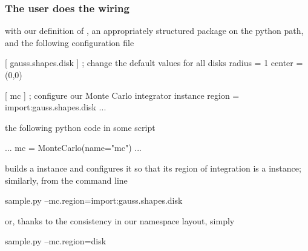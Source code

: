 \begin{frame}[fragile]
%
  \frametitle{The user does the wiring}
%
  with our definition of , an appropriately structured package
   on the python path, and the following configuration file
%
  \begin{icfg}{}
 [ gauss.shapes.disk ] ; change the default values for all disks
 radius = 1
 center = (0,0)

 [ mc ] ; configure our Monte Carlo integrator instance
 region = import:gauss.shapes.disk
 ...
  \end{icfg}{}
%
 the following python code in some script 
%
 \begin{ipython}{}
   ...
   mc = MonteCarlo(name="mc")
   ...
 \end{ipython}
%
 builds a  instance and configures it so that its region of
 integration is a  instance; similarly, from the command line
%
 \begin{ish}{}
    sample.py --mc.region=import:gauss.shapes.disk
 \end{ish}
%
 or, thanks to the consistency in our namespace layout, simply
%
 \begin{ish}{}
    sample.py --mc.region=disk
 \end{ish}
%
\end{frame}

